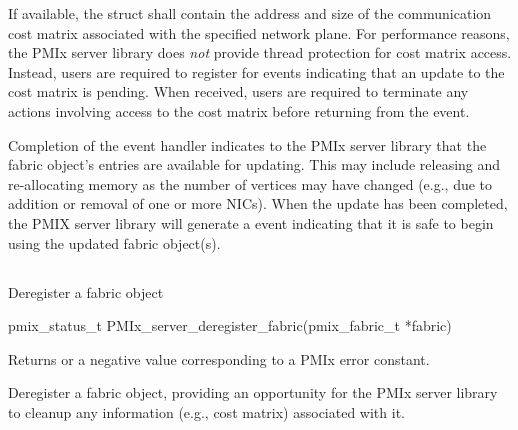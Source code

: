 If available, the  struct shall contain the address and size of the communication cost matrix associated with the specified network plane. For performance reasons, the \ac{PMIx} server library does \emph{not} provide thread protection for cost matrix access. Instead, users are required to register for  events indicating that an update to the cost matrix is pending. When received, users are required to terminate any actions involving access to the cost matrix before returning from the event.

Completion of the  event handler indicates to the \ac{PMIx} server library that the fabric object's entries are available for updating. This may include releasing and re-allocating memory as the number of vertices may have changed (e.g., due to addition or removal of one or more \acp{NIC}). When the update has been completed, the \ac{PMIX} server library will generate a  event indicating that it is safe to begin using the updated fabric object(s).

\subsection{}

\summary

Deregister a fabric object

\format

\cspecificstart
\begin{codepar}
pmix_status_t PMIx_server_deregister_fabric(pmix_fabric_t *fabric)
\end{codepar}
\cspecificend

\begin{arglist}
\end{arglist}

Returns  or a negative value corresponding to a \ac{PMIx} error constant.

\descr

Deregister a fabric object, providing an opportunity for the \ac{PMIx} server library to cleanup any information (e.g., cost matrix) associated with it.


\subsection{}

